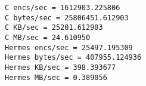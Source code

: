 \begin{lstlisting}[label=listing:bench_C_results, caption=The optimized C is approximately 63 times faster as $24.610950 / 0.389056 \simeq 63$., float= htp]
C encs/sec = 1612903.225806
C bytes/sec = 25806451.612903
C KB/sec = 25201.612903
C MB/sec = 24.610950
Hermes encs/sec = 25497.195309
Hermes bytes/sec = 407955.124936
Hermes KB/sec = 398.393677
Hermes MB/sec = 0.389056
\end{lstlisting}

